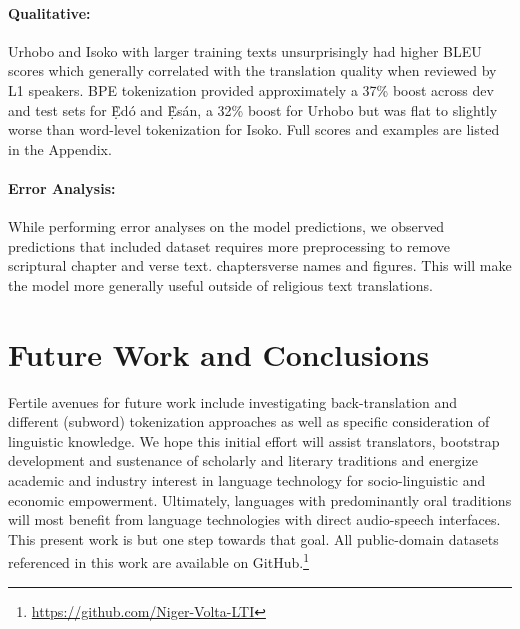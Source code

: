 \documentclass{article} %
\begin{document}
\paragraph{Qualitative:} Urhobo and Isoko with larger training texts unsurprisingly had higher BLEU scores which generally correlated with the translation quality when reviewed by L1 speakers. BPE tokenization provided approximately a 37\% boost across dev and test sets for \d{\`E}d{\'o} and \d{\`E}s{\'a}n, a 32\% boost for Urhobo but was flat to slightly worse than word-level tokenization for Isoko. Full scores and examples are listed in the Appendix.

\paragraph{Error Analysis:} While performing error analyses on the model predictions, we observed predictions that included  dataset requires more preprocessing to remove scriptural chapter and verse text.  chapters\/verse names and figures. This will make the model more generally useful outside of religious text translations.

\section{Future Work and Conclusions}
Fertile avenues for future work include investigating back-translation and different (subword) tokenization approaches as well as specific consideration of linguistic knowledge. We hope this initial effort will assist translators, bootstrap development and sustenance of scholarly and literary traditions and energize academic and industry interest in language technology for socio-linguistic and economic empowerment. Ultimately, languages with predominantly oral traditions will most benefit from language technologies with direct audio-speech interfaces. This present work is but one step towards that goal. All public-domain datasets referenced in this work are available on GitHub.\footnote{\url{https://github.com/Niger-Volta-LTI}}
 
% 
\end{document}

